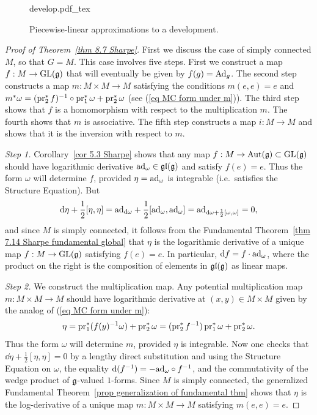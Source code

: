 \begin{figure}[tp]
    \def\svgwidth{0.5\linewidth}
    \centering
    {develop.pdf_tex}
    \caption{Piecewise-linear approximations to a development.\label{fig:develop}}
\end{figure}

\begin{proof}[Proof of Theorem~\ref{thm 8.7 Sharpe}]
    First we discuss the case of simply connected $M$, so that $G=M$. This case involves five steps. First we construct a map $f:M\to \operatorname{GL}(\mathfrak{g})$ that will eventually be given by $f(g)=\mathrm{Ad}_g$. The second step constructs a map $m:M\times M\to M$ satisfying the conditions $m(e,e)=e$ and $m^\ast \omega=(\operatorname{pr}_2^\ast f)^{-1} \circ \operatorname{pr}_1^\ast\omega+\operatorname{pr}_2^\ast\omega$ (see (\ref{eq MC form under m})). The third step shows that $f$ is a homomorphism with respect to the multiplication $m$. The fourth shows that $m$ is associative. The fifth step constructs a map $i:M\to M$ and shows that it is the inversion with respect to $m$.

    \emph{Step 1.} Corollary~\ref{cor 5.3 Sharpe} shows that any map $f:M\to \operatorname{Aut}(\mathfrak{g})\subset \operatorname{GL}(\mathfrak{g})$ should have logarithmic derivative $\mathrm{ad}_{\omega}\in \mathfrak{gl}(\mathfrak{g})$ and satisfy $f(e)=e$. Thus the form $\omega$ will determine $f$, provided $\eta=\mathrm{ad}_\omega$ is integrable (i.e.\ satisfies the Structure Equation). But
    \[{\mathrm{d}}\eta+\frac12[\eta,\eta]=\mathrm{ad}_{{\mathrm{d}}\omega}+\frac12[\mathrm{ad}_\omega,\mathrm{ad}_\omega]=\mathrm{ad}_{{\mathrm{d}}\omega+\frac12[\omega,\omega]}=0,\]
    and since $M$ is simply connected, it follows from the Fundamental Theorem~\ref{thm 7.14 Sharpe fundamental global} that $\eta$ is the logarithmic derivative of a unique map $f:M\to \operatorname{GL}(\mathfrak{g})$ satisfying $f(e)=e$. In particular, ${\mathrm{d}} f=f\cdot \mathrm{ad}_\omega$, where the product on the right is the composition of elements in $\mathfrak{gl}(\mathfrak{g})$ as linear maps.

    \emph{Step 2.} We construct the multiplication map. Any potential multiplication map $m:M\times M\to M$ should have logarithmic derivative at $(x,y)\in M\times M$ given by the analog of (\ref{eq MC form under m}):
    \[\eta=\operatorname{pr}_1^\ast (f(y)^{-1}\omega)+\operatorname{pr}_2^\ast\omega=(\operatorname{pr}_2^\ast f^{-1})\operatorname{pr}_1^\ast\omega+\operatorname{pr}_2^\ast\omega.\]
    Thus the form $\omega$ will determine $m$, provided $\eta$ is integrable. Now one checks that $\dd\eta+\frac12[\eta,\eta]=0$ by a lengthy direct substitution and using the Structure Equation on $\omega$, the equality ${\mathrm{d}} (f^{-1})=-\mathrm{ad}_\omega\circ f^{-1}$, and the commutativity of the wedge product of $\mathfrak{g}$-valued $1$-forms. Since $M$ is simply connected, the generalized Fundamental Theorem~\ref{prop generalization of fundamental thm} shows that $\eta$ is the log-derivative of a unique map $m:M\times M\to M$ satisfying $m(e,e)=e$.


\end{proof}
